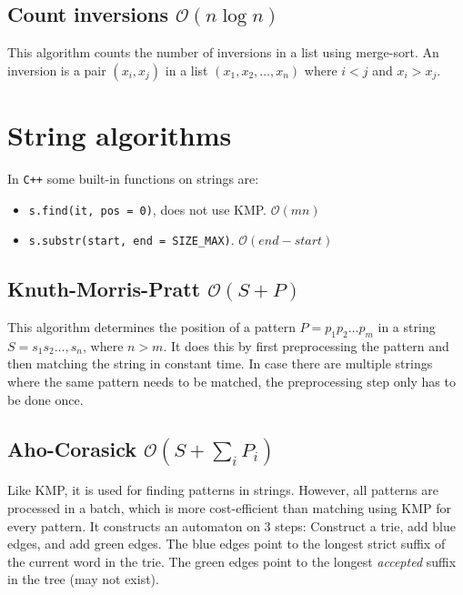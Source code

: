 \subsection{Count inversions $\mathcal O(n\log n)$}

This algorithm counts the number of inversions in a list using merge-sort. An inversion is a pair $(x_i, x_j)$ in a list $(x_1, x_2, \dots, x_n)$ where $i < j$ and $x_i > x_j$.





\section{String algorithms}

In \texttt{C++} some built-in functions on strings are:
\begin{itemize}
    \item \texttt{s.find(it, pos = 0)}, does not use KMP. $\mathcal O(mn)$
    \item \texttt{s.substr(start, end = SIZE\_MAX)}. $\mathcal O(end - start)$
\end{itemize}

\subsection{Knuth-Morris-Pratt $\mathcal O(S + P)$}

This algorithm determines the position of a pattern $P = p_1p_2\dots p_m$ in a string $S = s_1s_2\dots, s_n$, where $n > m$. It does this by first preprocessing the pattern and then matching the string in constant time. In case there are multiple strings where the same pattern needs to be matched, the preprocessing step only has to be done once.



\subsection{Aho-Corasick $\mathcal O(S + \sum_i P_i)$}

Like KMP, it is used for finding patterns in strings. However, all patterns are processed in a batch, which is more cost-efficient than matching using KMP for every pattern. It constructs an automaton on 3 steps: Construct a trie, add blue edges, and add green edges. The blue edges point to the longest strict suffix of the current word in the trie. The green edges point to the longest \textit{accepted} suffix in the tree (may not exist).

